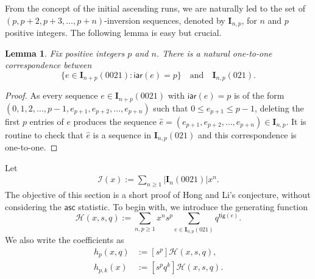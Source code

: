 \documentclass[reqno]{amsart}
\numberwithin{equation}{section}
\theoremstyle{plain}
\newtheorem{lemma}[theorem]{Lemma}
\theoremstyle{definition}
\theoremstyle{named}
\newcommand{\bI}{\mathbf{I}}
\newcommand{\asc}{\mathsf{asc}}
\newcommand{\iar}{\mathsf{iar}}
\newcommand{\tig}{\mathsf{tig}}
\newcommand{\cI}{\mathcal{I}}
\newcommand{\cH}{\mathcal{H}}
\begin{document}
From the concept of the initial ascending runs, we are naturally led to the set of $(p,p+2,p+3,\ldots,p+n)$-inversion sequences, denoted by $\bI_{n,p}$, for $n$ and $p$ positive integers. The following lemma is easy but crucial. 

\begin{lemma}\label{lem:0021}
	Fix positive integers $p$ and $n$. There is a natural one-to-one correspondence between 
	$$
	\{e\in\bI_{n+p}(0021):\iar(e)=p\}\quad\text{and}\quad \bI_{n,p}(021). 
	$$
\end{lemma}
\begin{proof}
	As every sequence $e\in\bI_{n+p}(0021)$ with $\iar(e)=p$ is of the form $(0,1,2,\ldots,p-1,e_{p+1},e_{p+2},\ldots,e_{p+n})$ such that $0\leq e_{p+1}\leq p-1$, deleting the first $p$ entries of $e$ produces the sequence $\hat{e}=(e_{p+1},e_{p+2},\ldots,e_{p+n})\in\bI_{n,p}$. It is routine to check that $\hat{e}$ is a sequence in $\bI_{n,p}(021)$ and this correspondence is one-to-one. 
\end{proof}

Let
\begin{align}
	 \cI(x):=\sum_{n\geq1}|\bI_n(0021)|x^n.
\end{align}
The objective of this section is a short proof of Hong and Li's conjecture, without considering the $\asc$ statistic. To begin with, we introduce the generating function
$$
\cH(x,s,q):=\sum_{n,p\geq1}x^ns^p\sum_{e\in\bI_{n,p}(021)}q^{\tig(e)}.
$$
We also write the coefficients as
\begin{align*}
	h_p(x,q)&:=[s^p]\cH(x,s,q),\\
	h_{p,k}(x)&:=[s^pq^k]\cH(x,s,q).
\end{align*}
\end{document}
